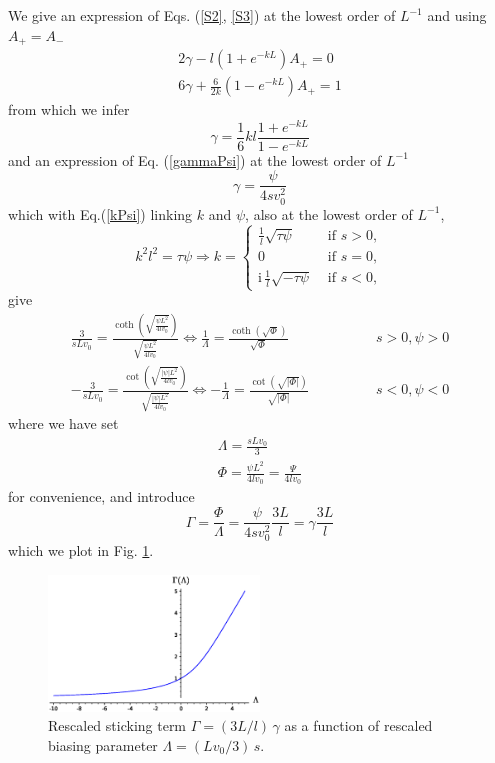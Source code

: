 \documentclass[pre,aps,superscriptaddress,nofootinbib]{revtex4}
\begin{document}
We give an expression of Eqs. (\ref{S2}, \ref{S3}) at the lowest order of $L^{-1}$ and using $A_+ = A_-$
\begin{eqnarray}
\label{SC1}
2 \gamma - l(1 + e^{-kL}) A_+ = 0\\
\label{SC2}
6 \gamma + \frac{6}{2k} (1 - e^{-kL}) A_+ = 1
\end{eqnarray}
from which we infer
\begin{equation}
\label{SCgamma}
\gamma = \frac{1}{6} k l \frac{1 + e^{-kL}}{1 - e^{-kL}}
\end{equation}
and an expression of Eq. (\ref{gammaPsi}) at the lowest order of $L^{-1}$
\begin{equation}
\gamma = \frac{\psi}{4 s v_0^2}
\end{equation}
which with Eq.(\ref{kPsi}) linking $k$ and $\psi$, also at the lowest order of $L^{-1}$,
\begin{equation}
\label{SCkl}
k^2 l^2 = \tau \psi \Rightarrow k = \begin{cases} \frac{1}{l} \sqrt{\tau\psi} &\text{ if } s > 0, \\ 0 &\text{ if } s = 0, \\ \mathrm{i} \, \frac{1}{l} \sqrt{- \tau\psi} &\text{ if } s < 0, \end{cases}
\end{equation}
give
\begin{eqnarray}
\frac{3}{s L v_0} = \frac{\coth\left(\sqrt{\frac{\psi L^2}{4 l v_0}}\right)}{\sqrt{\frac{\psi L^2}{4 l v_0}}} \Leftrightarrow \frac{1}{\Lambda} = \frac{\coth\left(\sqrt{\Phi}\right)}{\sqrt{\Phi}} &\qquad\qquad s > 0, \psi > 0\\
- \frac{3}{s L v_0} = \frac{\cot\left(\sqrt{\frac{|\psi| L^2}{4 l v_0}}\right)}{\sqrt{\frac{|\psi| L^2}{4 l v_0}}} \Leftrightarrow - \frac{1}{\Lambda} = \frac{\cot\left(\sqrt{|\Phi|}\right)}{\sqrt{|\Phi|}} &\qquad\qquad s < 0, \psi < 0
\end{eqnarray}
where we have set
\begin{eqnarray}
\label{Lambda}
\Lambda = \frac{s L v_0}{3}\\
\label{Phi}
\Phi = \frac{\psi L^2}{4 l v_0} = \frac{\Psi}{4 l v_0}
\end{eqnarray}
for convenience, and introduce
\begin{equation}
\Gamma = \frac{\Phi}{\Lambda} = \frac{\psi}{4 s v_0^2} \frac{3 L}{l} = \gamma \frac{3 L}{l}
\label{eqGamma}
\end{equation}
which we plot in Fig. \ref{Gamma}.

\begin{figure}[H]
\centering
\includegraphics[width=0.5\textwidth]{gamma.eps}
\caption{Rescaled sticking term $\Gamma = (3L/l) \, \gamma$ as a function of rescaled biasing parameter $\Lambda = (L v_0/3) \, s$.}
\label{Gamma}
\end{figure}
\end{document}
